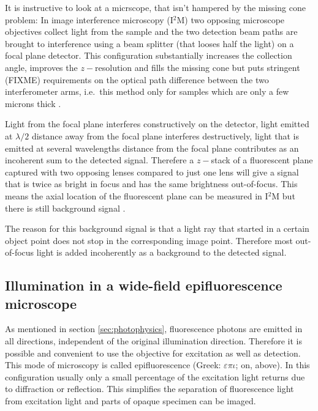It is instructive to look at a micrscope, that isn't hampered by the
missing cone problem: In image interference microscopy (I${}^2$M) two
opposing microscope objectives collect light from the sample and the
two detection beam paths are brought to interference using a beam
splitter (that looses half the light) on a focal plane detector. This
configuration substantially increases the collection angle, improves
the $z-$resolution and fills the missing cone but puts stringent
(FIXME) requirements on the optical path difference between the two
interferometer arms, i.e.\ this method only for samples which are only
a few microns thick \citep{Gustafsson1999}.

Light from the focal plane interferes constructively on the detector,
light emitted at $\lambda/2$ distance away from the focal plane
interferes destructively, light that is emitted at several wavelengths
distance from the focal plane contributes as an incoherent sum to the
detected signal. Therefere a $z-$stack of a fluorescent plane captured
with two opposing lenses compared to just one lens will give a signal
that is twice as bright in focus and has the same brightness
out-of-focus. This means the axial location of the fluorescent plane
can be measured in I${}^2$M but there is still background signal
\citep{Gustafsson1995}.

The reason for this background signal is that a light ray that started
in a certain object point does not stop in the corresponding image
point. Therefore most out-of-focus light is added incoherently as a
background to the detected signal.


\subsection{Illumination in a wide-field epifluorescence microscope}
As mentioned in section \ref{sec:photophysics}, fluorescence photons
are emitted in all directions, independent of the original
illumination direction. Therefore it is possible and convenient to use
the objective for excitation as well as detection. This mode of
microscopy is called epifluorescence (Greek: $\varepsilon\pi\iota$;
on, above).  In this configuration usually only a small percentage of
the excitation light returns due to diffraction or reflection. This
simplifies the separation of fluorescence light from excitation light
and parts of opaque specimen can be imaged.

